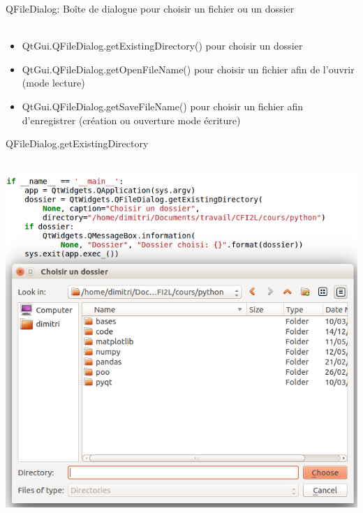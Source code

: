 \documentclass[9pt, french, brown]{beamer}
\newcommand{\mytitle}[1]{{\color{brown}#1 \\~\\}}
\begin{document}
\begin{frame}{\secname}{\subsecname{}}
\mytitle{QFileDialog: Boîte de dialogue pour choisir un fichier ou un dossier}
\begin{itemize}
\item QtGui.QFileDialog.getExistingDirectory() pour choisir un dossier
\item QtGui.QFileDialog.getOpenFileName() pour choisir un fichier afin de l\rq{}ouvrir (mode lecture)
\item QtGui.QFileDialog.getSaveFileName() pour choisir un fichier afin d\rq{}enregistrer (création ou ouverture mode écriture)
\end{itemize}
\end{frame}

\begin{frame}{\secname}{\subsecname{}}
\mytitle{QFileDialog.getExistingDirectory}
\begin{center}\includegraphics[scale=0.3]{img/filedialog1}\end{center}
\end{frame}
\end{document}
